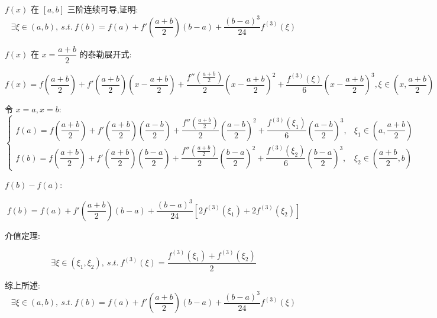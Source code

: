 \begin{proposition}
	$f(x)$ 在 $[a,b]$ 三阶连续可导,证明: $$\exists \xi\in(a,b),\ s.t.\ f(b)=f(a)+f'(\dfrac{a+b}{2})(b-a)+\dfrac{(b-a)^3}{24}f^{(3)}(\xi)$$
\end{proposition}
\begin{solution}

	$f(x)$ 在 $x=\dfrac{a+b}{2}$ 的泰勒展开式:

	$$f(x)=f(\dfrac{a+b}{2})+f'(\dfrac{a+b}{2})(x-\dfrac{a+b}{2})+\dfrac{f''(\frac{a+b}{2})}{2}(x-\dfrac{a+b}{2})^2+\dfrac{f^{(3)}(\xi)}{6}(x-\dfrac{a+b}{2})^3,\xi\in(x,\dfrac{a+b}{2})$$

	令 $x = a, x=b$:
	$$\begin{cases}
		f(a) = f(\dfrac{a+b}{2})+f'(\dfrac{a+b}{2})(\dfrac{a-b}{2})+\dfrac{f''(\frac{a+b}{2})}{2}(\dfrac{a-b}{2})^2+\dfrac{f^{(3)}(\xi_{1})}{6}(\dfrac{a-b}{2})^3, & \xi_{1}\in (a,\dfrac{a+b}{2}) \\
		f(b) = f(\dfrac{a+b}{2})+f'(\dfrac{a+b}{2})(\dfrac{b-a}{2})+\dfrac{f''(\frac{a+b}{2})}{2}(\dfrac{b-a}{2})^2+\dfrac{f^{(3)}(\xi_{2})}{6}(\dfrac{b-a}{2})^3, & \xi_{2}\in(\dfrac{a+b}{2},b)
	\end{cases}$$

	$f(b) - f(a)$:

	$$f(b) = f(a) + f'(\frac{a+b}{2})(b-a)+\dfrac{(b-a)^3}{24}[2f^{(3)}(\xi_{1})+2f^{(3)}(\xi_{2})]$$

	介值定理:
	
	$$\exists\xi\in(\xi_{1},\xi_{2}),\ s.t.\ f^{(3)}(\xi)=\dfrac{f^{(3)}(\xi_{1})+f^{(3)}(\xi_{2})}{2}$$

	综上所述:
	$$\exists \xi\in(a,b),\ s.t.\ f(b)=f(a)+f'(\dfrac{a+b}{2})(b-a)+\dfrac{(b-a)^3}{24}f^{(3)}(\xi)$$
\end{solution}

